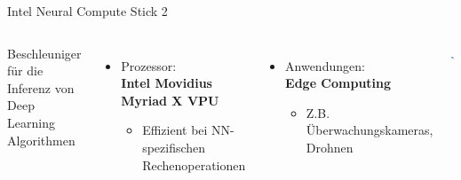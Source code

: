 \begin{frame}{Intel Neural Compute Stick 2}
    \begin{columns}[T]
        Beschleuniger für die Inferenz von Deep Learning Algorithmen
        \vspace{0.3cm}

        \begin{itemize}    
            \item Prozessor:\\\textbf{Intel Movidius Myriad X VPU}
            \begin{itemize}
                \item Effizient bei NN-spezifischen Rechenoperationen
            \end{itemize}    
        \end{itemize}

        \begin{itemize}
            \item Anwendungen:\\\textbf{Edge Computing}
            \begin{itemize}
                \item Z.B. Überwachungskameras, Drohnen
            \end{itemize}
        \end{itemize}
        
        \vspace{1cm}
        \includegraphics[width=0.8\textwidth]{Bilder/ncs2.jpg}
    \end{columns}        
\end{frame}